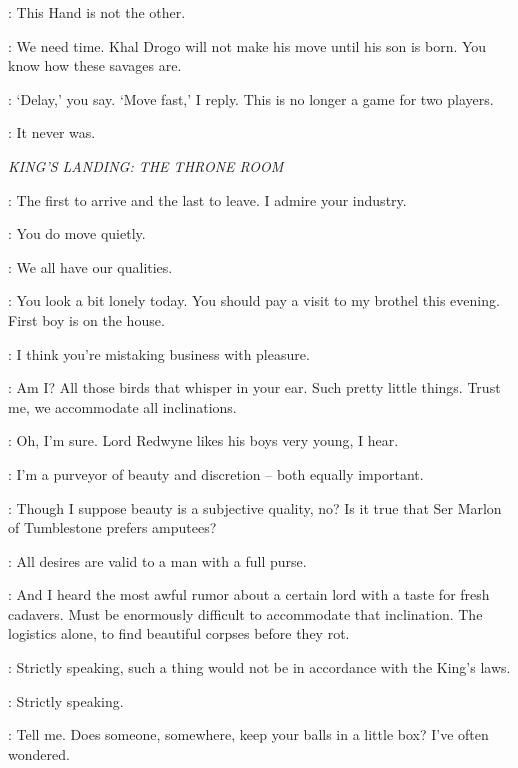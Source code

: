 \VARYS: This Hand is not the other. 

\ILLYRIO: We need time. Khal Drogo will not make his move until his son is born. You know how these savages are. 

\VARYS: `Delay,' you say. `Move fast,' I reply. This is no longer a game for two players. 

\ILLYRIO: It never was. 



\scene

\textit{KING'S LANDING: THE THRONE ROOM} 


\VARYS: The first to arrive and the last to leave. I admire your industry. 

\LITTLEFINGER: You do move quietly. 

\VARYS: We all have our qualities. 

\LITTLEFINGER: You look a bit lonely today. You should pay a visit to my brothel this evening. First boy is on the house. 

\VARYS: I think you're mistaking business with pleasure. 

\LITTLEFINGER: Am I? All those birds that whisper in your ear.  Such pretty little things. Trust me, we accommodate all inclinations. 

\VARYS: Oh, I'm sure. Lord Redwyne likes his boys very young, I hear. 

\LITTLEFINGER: I'm a purveyor of beauty and discretion -- both equally important. 

\VARYS: Though I suppose beauty is a subjective quality, no? Is it true that Ser Marlon of Tumblestone prefers amputees? 

\LITTLEFINGER: All desires are valid to a man with a full purse. 

\VARYS: And I heard the most awful rumor about a certain lord with a taste for fresh cadavers. Must be enormously difficult to accommodate that inclination. The logistics alone, to find beautiful corpses before they rot. 

\LITTLEFINGER: Strictly speaking, such a thing would not be in accordance with the King's laws. 

\VARYS: Strictly speaking. 

\LITTLEFINGER: Tell me. Does someone, somewhere, keep your balls in a little box? I've often wondered. 

